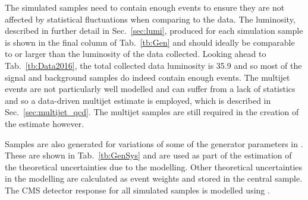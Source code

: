 The simulated samples need to contain enough events to ensure they are not affected by statistical fluctuations when comparing to the data.
The luminosity, described in further detail in Sec.~\ref{sec:lumi}, produced for each simulation sample is shown in the final column of Tab.~\ref{tb:Gen} and should ideally be comparable to or larger than the luminosity of the data collected.
Looking ahead to Tab.~\ref{tb:Data2016}, the total collected data luminosity is 35.9\fbinv{} and so most of the signal and background samples do indeed contain enough events.
The multijet \QCD{} events are not particularly well modelled and can suffer from a lack of statistics and so a data-driven multijet \QCD{} estimate is employed, which is described in Sec.~\ref{sec:multijet_qcd}.
The multijet \QCD{} samples are still required in the creation of the estimate however.

Samples are also generated for variations of some of the generator parameters in \powhegpythia{}.
These are shown in Tab.~\ref{tb:GenSys} and are used as part of the estimation of the theoretical uncertainties due to the modelling.
Other theoretical uncertainties in the modelling are calculated as event weights and stored in the central \powhegpythia{} sample.
The CMS detector response for all simulated samples is modelled using \GEANT{}.








